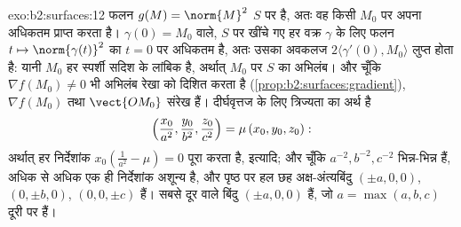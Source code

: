 \begin{solution}{exo:b2:surfaces:12}
फलन $g(M) = \norm{M}^2$  $S$ पर  है, अतः वह किसी $M_0$ पर अपना अधिकतम
प्राप्त करता है। $\gamma(0) = M_0$ वाले, $S$ पर खींचे गए हर वक्र $\gamma$ के लिए
फलन $t
\mapsto \norm{\gamma(t)}^2$ का $t = 0$ पर अधिकतम है, अतः उसका अवकलज $2\langle\gamma'(0), M_0\rangle$ लुप्त होता है:
यानी $M_0$ हर स्पर्शी सदिश के लांबिक है, अर्थात् $M_0$ पर $S$ का
अभिलंब। और चूँकि $\nabla f(M_0) \neq 0$ भी अभिलंब रेखा को दिशित करता है (\cref{prop:b2:surfaces:gradient}),
$\nabla f(M_0)$ तथा $\vect{OM_0}$ संरेख हैं। दीर्घवृत्तज के लिए त्रिज्यता का अर्थ है
\[
\Bigl(\frac{x_0}{a^2}, \frac{y_0}{b^2},
\frac{z_0}{c^2}\Bigr) = \mu\,(x_0, y_0, z_0) :
\]
अर्थात् हर निर्देशांक $x_0(\frac1{a^2} - \mu) = 0$ पूरा करता है, इत्यादि; और चूँकि $a^{-2}, b^{-2}, c^{-2}$
भिन्न-भिन्न हैं, अधिक से अधिक एक ही निर्देशांक अशून्य है, और पृष्ठ
पर हल छह अक्ष-अंत्यबिंदु $(\pm a, 0, 0)$, $(0, \pm b, 0)$, $(0,
0, \pm c)$ हैं। सबसे दूर वाले
बिंदु $(\pm a, 0, 0)$ हैं, जो $a = \max(a,b,c)$ दूरी पर हैं।
\end{solution}

